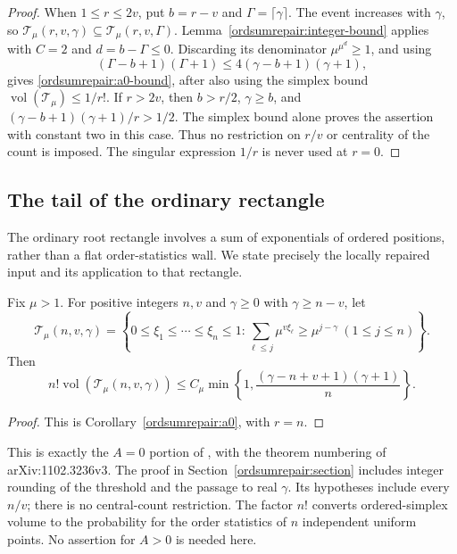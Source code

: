 \begin{proof}
When $1\leq r\leq2v$, put $b=r-v$ and
$\Gamma=\lceil\gamma\rceil$. The event increases with $\gamma$, so
$\mathcal T_\mu(r,v,\gamma)\subseteq\mathcal T_\mu(r,v,\Gamma)$.
Lemma~\ref{ordsumrepair:integer-bound} applies with $C=2$ and
$d=b-\Gamma\leq0$. Discarding its denominator
$\mu^{\mu^d}\geq1$, and using
\[
 (\Gamma-b+1)(\Gamma+1)
 \leq4(\gamma-b+1)(\gamma+1),
\]
gives \eqref{ordsumrepair:a0-bound}, after also using the simplex
bound $\operatorname{vol}(\mathcal T_\mu)\leq1/r!$.
If $r>2v$, then $b>r/2$, $\gamma\geq b$, and
$(\gamma-b+1)(\gamma+1)/r>1/2$. The simplex bound alone proves
the assertion with constant two in this case.
Thus no restriction on $r/v$ or centrality of the count is imposed.
The singular expression $1/r$ is never used at $r=0$.
\end{proof}

\subsection{The tail of the ordinary rectangle}
\label{ordsum:section}

The ordinary root rectangle involves a sum of exponentials of ordered
positions, rather than a flat order-statistics wall. We state precisely
the locally repaired input and its application to that rectangle.

\begin{lemma}[Ordered-sum estimate in the required $A=0$ range]
\label{ordsum:published}
Fix $\mu>1$. For positive integers $n,v$ and
$\gamma\geq0$ with $\gamma\geq n-v$, let
\[
 \mathcal T_\mu(n,v,\gamma)=
 \left\{0\leq\xi_1\leq\cdots\leq\xi_n\leq1:
      \sum_{\ell\leq j}\mu^{v\xi_\ell}
                   \geq\mu^{j-\gamma}\ (1\leq j\leq n)\right\}.
\]
Then
\begin{equation}
 n!\operatorname{vol}(\mathcal T_\mu(n,v,\gamma))
 \leq C_{\mu}\min\left\{1,
       \frac{(\gamma-n+v+1)(\gamma+1)}n\right\}.
 \label{ordsum:published-bound}
\end{equation}
\end{lemma}

\begin{proof}
This is Corollary~\ref{ordsumrepair:a0}, with $r=n$.
\end{proof}

This is exactly the $A=0$ portion of \cite[Lemma~5.5]{Kouk}, with the theorem numbering of arXiv:1102.3236v3.
The proof in
Section~\ref{ordsumrepair:section} includes integer rounding of the
threshold and the passage to real $\gamma$. Its hypotheses
include every $n/v$; there is no central-count restriction. The factor
$n!$ converts ordered-simplex volume to the probability for the order
statistics of $n$ independent uniform points. No assertion for $A>0$
is needed here.

